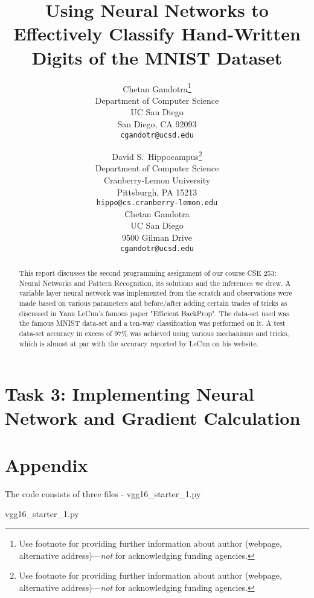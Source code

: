 \documentclass{article}
\title{Using Neural Networks to Effectively Classify Hand-Written Digits of the MNIST Dataset}
\author{
  Chetan Gandotra\thanks{Use footnote for providing further
    information about author (webpage, alternative
    address)---\emph{not} for acknowledging funding agencies.} \\
  Department of Computer Science\\
  UC San Diego\\
  San Diego, CA 92093 \\
  \texttt{cgandotr@ucsd.edu} \\
}
\author{
  David S.~Hippocampus\thanks{Use footnote for providing further
    information about author (webpage, alternative
    address)---\emph{not} for acknowledging funding agencies.} \\
  Department of Computer Science\\
  Cranberry-Lemon University\\
  Pittsburgh, PA 15213 \\
  \texttt{hippo@cs.cranberry-lemon.edu} \\
  Chetan Gandotra \\
  UC San Diego \\
  9500 Gilman Drive \\
  \texttt{cgandotr@ucsd.edu} \\
}
\begin{document}

\maketitle

\begin{abstract}
This report discusses the second programming assignment of our course CSE 253: Neural Networks and Pattern Recognition, its solutions and the inferences we drew. A variable layer neural network was implemented from the scratch and observations were made based on various parameters and before/after adding certain trades of tricks as discussed in Yann LeCun's famous paper "Efficient BackProp". The data-set used was the famous MNIST data-set and a ten-way classification was performed on it. A test data-set accuracy in excess of 97\% was achieved using various mechanisms and tricks, which is almost at par with the accuracy reported by LeCun on his website.
\end{abstract}

\section{Task 3: Implementing Neural Network and Gradient Calculation}
\newpage
\section*{Appendix}
The code consists of three files - vgg16\_starter\_1.py

vgg16\_starter\_1.py
\end{document}

